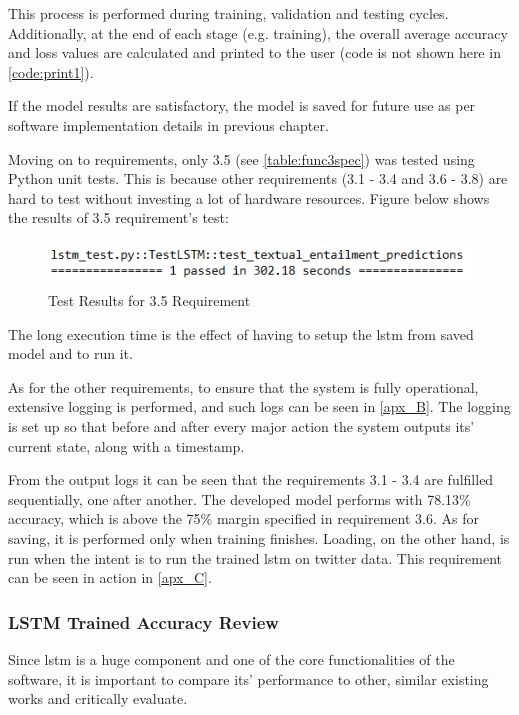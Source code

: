             This process is performed during training, validation and testing cycles. Additionally, at the end of each stage (e.g. training), the overall average accuracy and loss values are calculated and printed to the user (code is not shown here in \cref{code:print1}).
            
            If the model results are satisfactory, the model is saved for future use as per software implementation details in previous chapter.
            
            Moving on to requirements, only 3.5 (see \cref{table:func3spec}) was tested using Python unit tests. This is because other requirements (3.1 - 3.4 and 3.6 - 3.8) are hard to test without investing a lot of hardware resources. Figure below shows the results of 3.5 requirement's test:
            
            \begin{figure}[!htbp]
                \centering
                \includegraphics[]{img/test_lstm_entailment.png}
                \caption{Test Results for 3.5 Requirement}
                \label{fig:testres3}
            \end{figure}
            \FloatBarrier
            
            The long execution time is the effect of having to setup the \gls{lstm} from saved model and to run it.
            
            As for the other requirements, to ensure that the system is fully operational, extensive logging is performed, and such logs can be seen in \cref{apx_B}. The logging is set up so that before and after every major action the system outputs its' current state, along with a timestamp.
            
            From the output logs it can be seen that the requirements 3.1 - 3.4 are fulfilled sequentially, one after another. The developed model performs with 78.13\% accuracy, which is above the 75\% margin specified in requirement 3.6. As for saving, it is performed only when training finishes. Loading, on the other hand, is run when the intent is to run the trained \gls{lstm} on twitter data. This requirement can be seen in action in \cref{apx_C}.
            
            \subsubsection{LSTM Trained Accuracy Review} \label{similarworkcompare}
                Since \gls{lstm} is a huge component and one of the core functionalities of the software, it is important to compare its' performance to other, similar existing works and critically evaluate.
                
